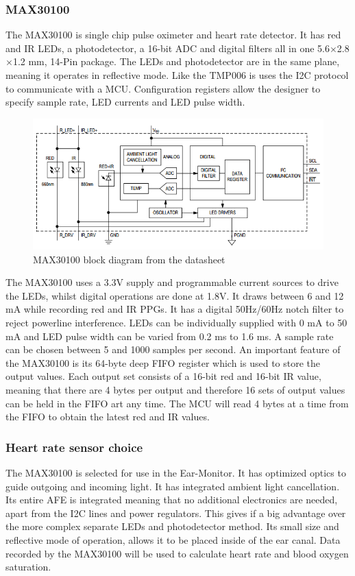 \subsubsection{MAX30100} 
The MAX30100 is single chip pulse oximeter and heart rate detector. It has red and IR LEDs, a photodetector, a 16-bit ADC and digital filters all in one 5.6$\times$2.8$\times$1.2 mm, 14-Pin package. The LEDs and photodetector are in the same plane, meaning it operates in reflective mode. Like the TMP006 is uses the I2C protocol to communicate with a MCU. Configuration registers allow the designer to specify sample rate, LED currents and LED pulse width.

\begin{figure}[H]
   \centering
   \includegraphics[scale=1]{figs/MAX30100_Diagram.png}
   \caption{MAX30100 block diagram from the datasheet}
   \label{fig:MAX30100_Diagram}
\end{figure}

The MAX30100 uses a 3.3V supply and programmable current sources to drive the LEDs, whilst digital operations are done at 1.8V. It draws between 6 and 12 mA while recording red and IR PPGs. It has a digital 50Hz/60Hz notch filter to reject powerline interference. LEDs can be individually supplied with 0 mA to 50 mA and LED pulse width can be varied from 0.2 ms to 1.6 ms. A sample rate can be chosen between 5 and 1000 samples per second. An important feature of the MAX30100 is its 64-byte deep FIFO register which is used to store the output values. Each output set consists of a 16-bit red and 16-bit IR value, meaning that there are 4 bytes per output and therefore 16 sets of output values can be held in the FIFO art any time. The MCU will read 4 bytes at a time from the FIFO to obtain the latest red and IR values.

\subsubsection{Heart rate sensor choice}
The MAX30100 is selected for use in the Ear-Monitor. It has optimized optics to guide outgoing and incoming light. It has integrated ambient light cancellation. Its entire AFE is integrated meaning that no additional electronics are needed, apart from the I2C lines and power regulators. This gives if a big advantage over the more complex separate LEDs and photodetector method. Its small size and reflective mode of operation, allows it to be placed inside of the ear canal. Data recorded by the MAX30100 will be used to calculate heart rate and blood oxygen saturation. 

